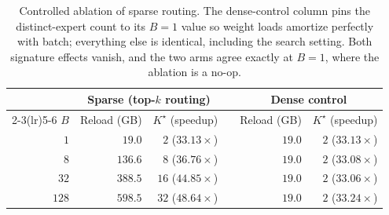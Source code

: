 \begin{table}[h]
\centering
\footnotesize
\caption{Controlled ablation of sparse routing. The dense-control column pins the
distinct-expert count to its $B=1$ value so weight loads amortize perfectly with
batch; everything else is identical, including the search setting. Both
signature effects vanish, and the two arms agree exactly at $B=1$, where the
ablation is a no-op.}
\label{tab:dense}
\begin{tabular}{@{}rrrrrr@{}}
\toprule
& \multicolumn{2}{c}{Sparse (top-$k$ routing)} & & \multicolumn{2}{c}{Dense control} \\
\cmidrule(lr){2-3}\cmidrule(lr){5-6}
$B$ & Reload (GB) & $K^\star$ (speedup) & & Reload (GB) & $K^\star$ (speedup) \\
\midrule
$1$   & $19.0$  & $2$  ($33.13\times$) & & $19.0$ & $2$ ($33.13\times$) \\
$8$   & $136.6$ & $8$  ($36.76\times$) & & $19.0$ & $2$ ($33.08\times$) \\
$32$  & $388.5$ & $16$ ($44.85\times$) & & $19.0$ & $2$ ($33.06\times$) \\
$128$ & $598.5$ & $32$ ($48.64\times$) & & $19.0$ & $2$ ($33.24\times$) \\
\bottomrule
\end{tabular}
\end{table}

